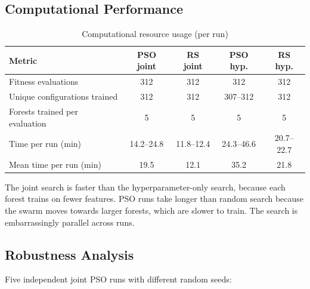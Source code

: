 \subsection{Computational Performance}

\begin{table}[H]
\centering
\small\setlength{\tabcolsep}{4pt}
\caption{Computational resource usage (per run)}
\begin{tabular}{|l|c|c|c|c|}
\hline
\textbf{Metric} & \textbf{PSO joint} & \textbf{RS joint} & \textbf{PSO hyp.} & \textbf{RS hyp.} \\ \hline
Fitness evaluations & 312 & 312 & 312 & 312 \\
Unique configurations trained & 312 & 312 & 307--312 & 312 \\
Forests trained per evaluation & 5 & 5 & 5 & 5 \\
Time per run (min) & 14.2--24.8 & 11.8--12.4 & 24.3--46.6 & 20.7--22.7 \\
Mean time per run (min) & 19.5 & 12.1 & 35.2 & 21.8 \\ \hline
\end{tabular}
\end{table}
The joint search is faster than the hyperparameter-only search, because each forest trains on fewer features. PSO runs take longer than random search because the swarm moves towards larger forests, which are slower to train. The search is embarrassingly parallel across runs.

\subsection{Robustness Analysis}

Five independent joint PSO runs with different random seeds:

